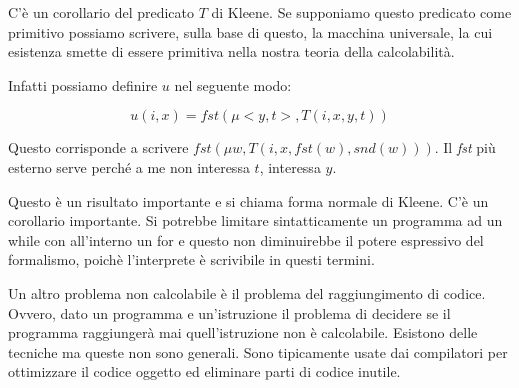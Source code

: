 C'è un corollario del predicato $T$ di Kleene. Se supponiamo questo predicato come primitivo
possiamo scrivere, sulla base di questo, la macchina universale, la cui esistenza smette di essere
primitiva nella nostra teoria della calcolabilità.

Infatti possiamo definire $u$ nel seguente modo:

\begin{equation*}
    u(i,x) = \textit{fst}(\mu <y,t>, T(i,x,y,t))
\end{equation*}

Questo corrisponde a scrivere $\textit{fst}(\mu w, T(i,x,\textit{fst}(w),\textit{snd}(w)))$. Il
\textit{fst} più esterno serve perché a me non interessa $t$, interessa $y$.

Questo è un risultato importante e si chiama forma normale di Kleene. C'è un corollario
importante. Si potrebbe limitare sintatticamente un programma ad un while con all'interno un for e
questo non diminuirebbe il potere espressivo del formalismo, poichè l'interprete è scrivibile in
questi termini.

Un altro problema non calcolabile è il problema del raggiungimento di codice. Ovvero, dato un
programma e un'istruzione il problema di decidere se il programma raggiungerà mai quell'istruzione
non è calcolabile. Esistono delle tecniche ma queste non sono generali. Sono tipicamente usate dai
compilatori per ottimizzare il codice oggetto ed eliminare parti di codice inutile.
